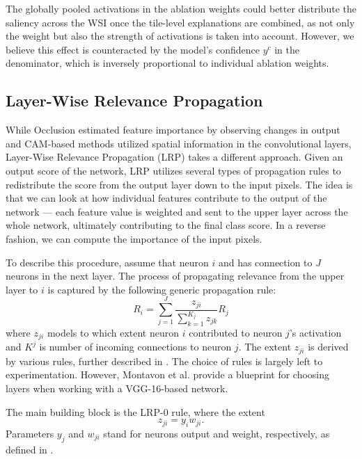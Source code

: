The globally pooled activations in the ablation weights could better distribute the saliency across the WSI once the tile-level explanations are combined, as not only the weight but also the strength of activations is taken into account.
However, we believe this effect is counteracted by the model's confidence $y^c$ in the denominator, which is inversely proportional to individual ablation weights.

\subsection{Layer-Wise Relevance Propagation}

While Occlusion estimated feature importance by observing changes in output and CAM-based methods utilized spatial information in the convolutional layers, Layer-Wise Relevance Propagation (LRP) \cite{lrp} takes a different approach.
Given an output score of the network, LRP utilizes several types of propagation rules to redistribute the score from the output layer down to the input pixels.
The idea is that we can look at how individual features contribute to the output of the network --- each feature value is weighted and sent to the upper layer across the whole network, ultimately contributing to the final class score.
In a reverse fashion, we can compute the importance of the input pixels.

To describe this procedure, assume that neuron $i$ and has connection to $J$ neurons in the next layer.
The process of propagating relevance from the upper layer to $i$ is captured by the following generic propagation rule:
\begin{equation}
    R_i = \sum_{j=1}^{J} \frac{z_{ji}}{\sum_{k=1}^{K_j} z_{jk}} R_j
\end{equation}
where $z_{ji}$ models to which extent neuron $i$ contributed to neuron $j$'s activation and $K^j$ is number of incoming connections to neuron $j$.
The extent $z_{ji}$ is derived by various rules, further described in \cite{lrp}.
The choice of rules is largely left to experimentation.
However, Montavon et al. \cite{lrp} provide a blueprint for choosing layers when working with a VGG-16-based network.

The main building block is the LRP-$0$ rule, where the extent
\begin{equation}
    z_{ji} = y_i w_{ji}.
\end{equation}
Parameters $y_j$ and $w_{ji}$ stand for neurons output and weight, respectively, as defined in .

